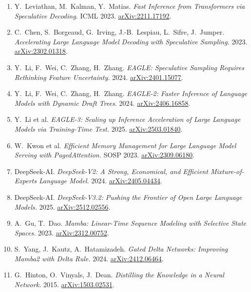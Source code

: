 \documentclass[11pt,a4paper]{article}
\theoremstyle{definition}
\theoremstyle{remark}
\theoremstyle{plain}
\newcommand{\arxivlink}[1]{\href{https://arxiv.org/abs/#1}{arXiv:#1}}
\begin{document}
\begin{enumerate}[leftmargin=1.8em, itemsep=3pt]
\item Y.\ Leviathan, M.\ Kalman, Y.\ Matias. \textit{Fast Inference from Transformers via Speculative Decoding.} ICML 2023. \arxivlink{2211.17192}.
\item C.\ Chen, S.\ Borgeaud, G.\ Irving, J.-B.\ Lespiau, L.\ Sifre, J.\ Jumper. \textit{Accelerating Large Language Model Decoding with Speculative Sampling.} 2023. \arxivlink{2302.01318}.
\item Y.\ Li, F.\ Wei, C.\ Zhang, H.\ Zhang. \textit{EAGLE: Speculative Sampling Requires Rethinking Feature Uncertainty.} 2024. \arxivlink{2401.15077}.
\item Y.\ Li, F.\ Wei, C.\ Zhang, H.\ Zhang. \textit{EAGLE-2: Faster Inference of Language Models with Dynamic Draft Trees.} 2024. \arxivlink{2406.16858}.
\item Y.\ Li et al. \textit{EAGLE-3: Scaling up Inference Acceleration of Large Language Models via Training-Time Test.} 2025. \arxivlink{2503.01840}.
\item W.\ Kwon et al. \textit{Efficient Memory Management for Large Language Model Serving with PagedAttention.} SOSP 2023. \arxivlink{2309.06180}.
\item DeepSeek-AI. \textit{DeepSeek-V2: A Strong, Economical, and Efficient Mixture-of-Experts Language Model.} 2024. \arxivlink{2405.04434}.
\item DeepSeek-AI. \textit{DeepSeek-V3.2: Pushing the Frontier of Open Large Language Models.} 2025. \arxivlink{2512.02556}.
\item A.\ Gu, T.\ Dao. \textit{Mamba: Linear-Time Sequence Modeling with Selective State Spaces.} 2023. \arxivlink{2312.00752}.
\item S.\ Yang, J.\ Kautz, A.\ Hatamizadeh. \textit{Gated Delta Networks: Improving Mamba2 with Delta Rule.} 2024. \arxivlink{2412.06464}.
\item G.\ Hinton, O.\ Vinyals, J.\ Dean. \textit{Distilling the Knowledge in a Neural Network.} 2015. \arxivlink{1503.02531}.
\end{enumerate}
\end{document}
